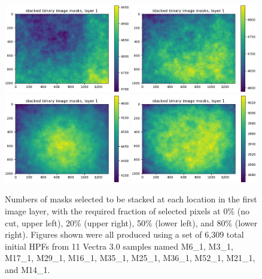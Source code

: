 \documentclass[letterpaper,11pt]{article}
\begin{document}
\begin{figure}[!ht]
\centering
\includegraphics[width=0.49\textwidth]{images/measuring_flatfield_corrections/example_mask_stack_layer_1_cut_at_0_00}
\includegraphics[width=0.49\textwidth]{images/measuring_flatfield_corrections/example_mask_stack_layer_1_cut_at_0_20}
\includegraphics[width=0.49\textwidth]{images/measuring_flatfield_corrections/example_mask_stack_layer_1_cut_at_0_50}
\includegraphics[width=0.49\textwidth]{images/measuring_flatfield_corrections/example_mask_stack_layer_1_cut_at_0_80}
\caption{\footnotesize Numbers of masks selected to be stacked at each location in the first image layer, with the required fraction of selected pixels at 0\% (no cut, upper left), 20\% (upper right), 50\% (lower left), and 80\% (lower right). Figures shown were all produced using a set of 6,309 total initial HPFs from 11 Vectra 3.0 samples named M6\_1, M3\_1, M17\_1, M29\_1, M16\_1, M35\_1, M25\_1, M36\_1, M52\_1, M21\_1, and M14\_1.}
\label{fig:selected_pixel_fraction_cut_1}
\end{figure}
\end{document}
